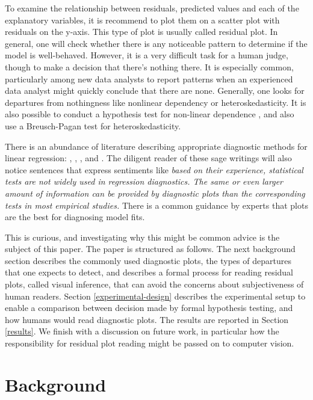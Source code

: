 \documentclass[]{interact}
\theoremstyle{plain}%
\theoremstyle{definition}
\theoremstyle{remark}
\begin{document}
To examine the relationship between residuals, predicted values and each
of the explanatory variables, it is recommend to plot them on a scatter
plot with residuals on the y-axis. This type of plot is usually called
residual plot. In general, one will check whether there is any
noticeable pattern to determine if the model is well-behaved. However,
it is a very difficult task for a human judge, though to make a decision
that there's nothing there. It is especially common, particularly among
new data analysts to report patterns when an experienced data analyst
might quickly conclude that there are none. Generally, one looks for
departures from nothingness like nonlinear dependency or
heteroskedasticity. It is also possible to conduct a hypothesis test for
non-linear dependence \citep{ramsey_tests_1969}, and also use a
Breusch-Pagan test \citep{breusch_simple_1979} for heteroskedasticity.

There is an abundance of literature describing appropriate diagnostic
methods for linear regression: \citet{draper1998applied},
\citet{montgomery1982introduction}, \citet{belsley_regression_1980},
\citet{cook_applied_1999} and \citet{cook1982residuals}. The diligent
reader of these sage writings will also notice sentences that express
sentiments like \emph{based on their experience, statistical tests are
not widely used in regression diagnostics. The same or even larger
amount of information can be provided by diagnostic plots than the
corresponding tests in most empirical studies.} There is a common
guidance by experts that plots are the best for diagnosing model fits.

This is curious, and investigating why this might be common advice is
the subject of this paper. The paper is structured as follows. The next
background section describes the commonly used diagnostic plots, the
types of departures that one expects to detect, and describes a formal
process for reading residual plots, called visual inference, that can
avoid the concerns about subjectiveness of human readers. Section
\ref{experimental-design} describes the experimental setup to enable a
comparison between decision made by formal hypothesis testing, and how
humans would read diagnostic plots. The results are reported in Section
\ref{results}. We finish with a discussion on future work, in particular
how the responsibility for residual plot reading might be passed on to
computer vision.

\hypertarget{background}{%
\section{Background}\label{background}}
\end{document}

